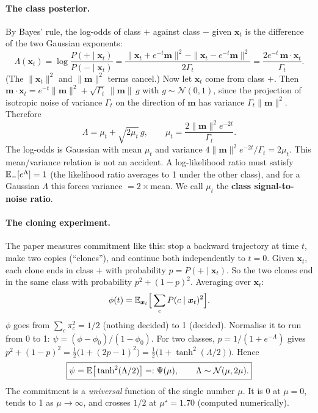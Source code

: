 \paragraph{The class posterior.} By Bayes' rule, the log-odds of class $+$ against class $-$ given $\bm x_t$ is the
difference of the two Gaussian exponents:
\[
\Lambda(\bm x_t)=\log\frac{P(+\mid\bm x_t)}{P(-\mid\bm x_t)}
=\frac{\|\bm x_t+e^{-t}\bm m\|^2-\|\bm x_t-e^{-t}\bm m\|^2}{2\Gamma_t}=\frac{2e^{-t}\,\bm m\cdot\bm x_t}{\Gamma_t}.
\]
(The $\|\bm x_t\|^2$ and $\|\bm m\|^2$ terms cancel.) Now let $\bm x_t$ come from class $+$. Then
$\bm m\cdot\bm x_t=e^{-t}\|\bm m\|^2+\sqrt{\Gamma_t}\,\|\bm m\|\,g$ with $g\sim\mathcal N(0,1)$, since the projection of
isotropic noise of variance $\Gamma_t$ on the direction of $\bm m$ has variance $\Gamma_t\|\bm m\|^2$. Therefore
\begin{equation}\label{eq:llr_gauss}
\Lambda=\mu_t+\sqrt{2\mu_t}\,g,\qquad \mu_t=\frac{2\|\bm m\|^2e^{-2t}}{\Gamma_t}.
\end{equation}
The log-odds is Gaussian with mean $\mu_t$ and variance $4\|\bm m\|^2e^{-2t}/\Gamma_t=2\mu_t$. This mean/variance
relation is not an accident. A log-likelihood ratio must satisfy $\mathbb{E}_-[e^{\Lambda}]=1$ (the likelihood ratio averages
to 1 under the other class), and for a Gaussian $\Lambda$ this forces variance $=2\times$mean. We call $\mu_t$ the
\textbf{class signal-to-noise ratio}.

\paragraph{The cloning experiment.} The paper measures commitment like this: stop a backward trajectory at time $t$,
make two copies (``clones''), and continue both independently to $t=0$. Given $\bm x_t$, each clone ends in class
$+$ with probability $p=P(+\mid\bm x_t)$. So the two clones end in the same class with probability $p^2+(1-p)^2$.
Averaging over $\bm x_t$:
\begin{equation}\label{eq:phi_def}
\phi(t)=\mathbb{E}_{\bm x_t}\Big[\sum_cP(c\mid\bm x_t)^2\Big].
\end{equation}
$\phi$ goes from $\sum_c\pi_c^2=1/2$ (nothing decided) to 1 (decided). Normalise it to run from 0 to 1:
$\psi=(\phi-\phi_0)/(1-\phi_0)$. For two classes, $p=1/(1+e^{-\Lambda})$ gives
$p^2+(1-p)^2=\tfrac12\big(1+(2p-1)^2\big)=\tfrac12\big(1+\tanh^2(\Lambda/2)\big)$. Hence
\begin{equation}\label{eq:psi_universal}
\boxed{\psi=\mathbb{E}\big[\tanh^2(\Lambda/2)\big]=:\Psi(\mu),\qquad \Lambda\sim\mathcal N(\mu,2\mu).}
\end{equation}
The commitment is a \emph{universal} function of the single number $\mu$. It is 0 at $\mu=0$, tends to 1 as
$\mu\to\infty$, and crosses $1/2$ at $\mu^\star=1.70$ (computed numerically).


